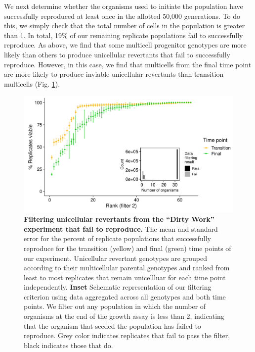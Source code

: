 \documentclass[
]{book}
\begin{document}
We next determine whether the organisms used to initiate the population have successfully reproduced at least once in the allotted 50,000 generations. To do this, we simply check that the total number of cells in the population is greater than 1. In total, 19\% of our remaining replicate populations fail to successfully reproduce. As above, we find that some multicell progenitor genotypes are more likely than others to produce unicellular revertants that fail to successfully reproduce. However, in this case, we find that multicells from the final time point are more likely to produce inviable unicellular revertants than transition multicells (Fig. \ref{fig:dw-filter-2-failure-to-divide}).

\begin{figure}
\centering
\includegraphics{images/Figure_S5_Dirty_work_Populations_that_fail_to_divide_NEW_14MAR23.png}
\caption{\label{fig:dw-filter-2-failure-to-divide}\textbf{Filtering unicellular revertants from the ``Dirty Work'' experiment that fail to reproduce.} The mean and standard error for the percent of replicate populations that successfully reproduce for the transition (yellow) and final (green) time points of our experiment. Unicellular revertant genotypes are grouped according to their multicellular parental genotypes and ranked from least to most replicates that remain unicellluar for each time point independently. \textbf{Inset} Schematic representation of our filtering criterion using data aggregated across all genotypes and both time points. We filter out any population in which the number of organisms at the end of the growth assay is less than 2, indicating that the organism that seeded the population has failed to reproduce. Grey color indicates replicates that fail to pass the filter, black indicates those that do.}
\end{figure}
\end{document}
